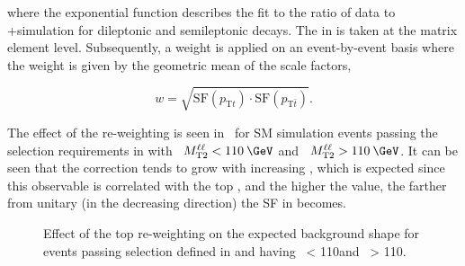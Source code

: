 where the exponential function describes the fit to the ratio of data to \POWHEG+\Pythia simulation for dileptonic and semileptonic \ttbar decays. The \pt in  is taken at the matrix element level. Subsequently, a weight is applied on an event-by-event basis where the weight is given by the geometric mean of the scale factors,

\begin{equation}
  w = \sqrt{\text{SF}(p_{\text{T}t})\cdot \text{SF}(p_{\text{T}\bar{t}})}.
\end{equation}

The effect of the re-weighting is seen in~ for SM \ttll simulation events passing the selection requirements in  with~\protect{} $\mttll< 110\:\GeV$ and~\protect{} $\mttll> 110\:\GeV$. It can be seen that the correction tends to grow with increasing \MET, which is expected since this observable is correlated with the top \pt, and the higher the \pt value, the farther from unitary (in the decreasing direction) the SF in  becomes.

\begin{figure}
  \caption{Effect of the top \pt re-weighting on the expected \ttll background \ptmiss shape for events passing selection defined in  and having~\protect{} \mttll < 110\:\GeV\:and~\protect{} \mttll > 110\:\GeV.}
  \label{fig:topPtRwgt}
\end{figure}

